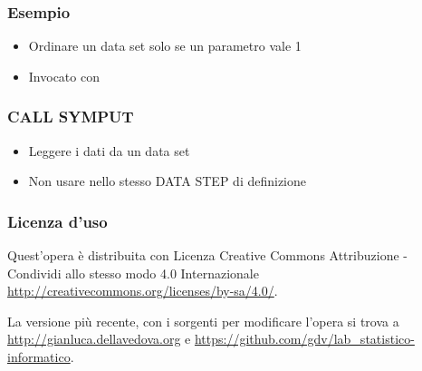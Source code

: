 \begin{frame}[containsverbatim]\frametitle{Esempio}
  \begin{itemize}
  \item
    Ordinare un data set solo se un parametro vale 1
  \end{itemize}
  \begin{itemize}
  \item
    Invocato con
  \end{itemize}
\end{frame}



\begin{frame}[containsverbatim]\frametitle{CALL SYMPUT}
  \begin{itemize}
  \item
    Leggere i dati da un data set
  \item
    Non usare nello stesso DATA STEP di definizione
  \end{itemize}
\end{frame}


\begin{frame}[containsverbatim]\frametitle{Licenza d'uso}
  \small
Quest'opera è distribuita con Licenza Creative Commons
Attribuzione - Condividi allo stesso modo 4.0 Internazionale
\url{http://creativecommons.org/licenses/by-sa/4.0/}.

La versione più recente, con i sorgenti per modificare l'opera si trova
a \url{http://gianluca.dellavedova.org} e
\url{https://github.com/gdv/lab_statistico-informatico}.

\end{frame}






